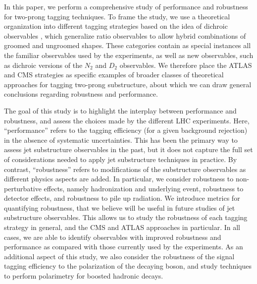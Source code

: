 \documentclass[11pt,letterpaper]{article}
\begin{document}
In this paper, we perform a comprehensive study of performance and robustness for two-prong tagging techniques.
%
To frame the study, we use a theoretical organization into different tagging strategies based on the idea of dichroic observables \cite{Salam:2016yht}, which generalize ratio observables to allow hybrid combinations of groomed and ungroomed shapes.
 These categories contain as special instances all the familiar observables used by the experiments, as well as new observables, such as dichroic versions of the $N_2$ and $D_2$ observables.
 We therefore place the ATLAS and CMS strategies as specific examples of broader classes of theoretical approaches for tagging two-prong substructure, about which we can draw general conclusions regarding robustness and performance.


The goal of this study is to highlight the interplay between performance and robustness, and assess the choices made by the different LHC experiments.
%
Here, ``performance'' refers to the tagging efficiency (for a given background rejection) in the absence of systematic uncertainties.
%
This has been the primary way to assess jet substructure observables in the past, but it does not capture the full set of considerations needed to apply jet substructure techniques in practice.
%
By contrast, ``robustness'' refers to modifications of the substructure observables as different physics aspects are added.
%
In particular, we consider robustness to non-perturbative effects, namely hadronization and underlying event, robustness to detector effects, and robustness to pile up radiation.
%
We introduce metrics for quantifying robustness, that we believe will be useful in future studies of jet substructure observables.
%
This allows us to study the robustness of each tagging strategy in general, and the CMS and ATLAS approaches in particular.
%
In all cases, we are able to identify observables with improved robustness and performance as compared with those currently used by the experiments.
%
%
As an additional aspect of this study, we also consider the robustness of the signal tagging efficiency to the polarization of the decaying boson, and study techniques to perform polarimetry for boosted hadronic decays. 
\end{document}
